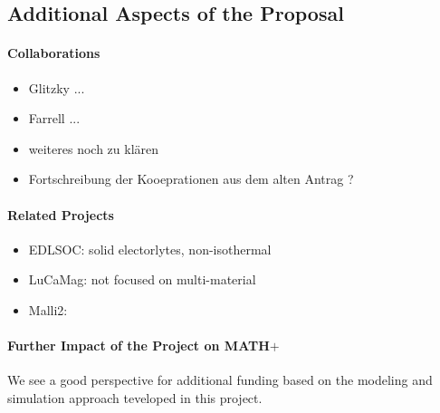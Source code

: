 \documentclass[a4paper,10pt]{article}
\begin{document}

\subsection*{Additional Aspects of the Proposal}

\paragraph{Collaborations}
\begin{itemize}
\item Glitzky ...
\item Farrell ...
\item weiteres noch zu klären
\end{itemize}

\begin{itemize}
\item Fortschreibung der Kooeprationen aus dem alten Antrag ?
\end{itemize}

\paragraph{Related Projects}
\begin{itemize}
\item EDLSOC: solid electorlytes, non-isothermal
\item LuCaMag: not focused on multi-material
\item Malli2: 
\end{itemize}

\paragraph{Further Impact of the Project on MATH$+$}
We see a good perspective for additional funding based on the modeling and simulation approach
teveloped in this project.
\end{document}
